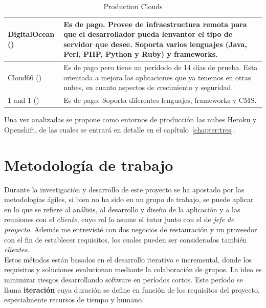 \begin{table}[H]
\begin{tabular}{p{2cm} p{8cm}}
	\hline
	DigitalOcean (\cite{URL:DigitalOcean}) & Es de pago. Provee de infraestructura remota para que el desarrollador pueda lenvantor el tipo de servidor que desee. Soporta varios lenguajes (Java, Perl, PHP, Python y Ruby) y frameworks. \\
	\hline
	Cloud66 (\cite{URL:Cloud66}) & Es de pago pero tiene un perídodo de 14 días de prueba. Esta orientada a mejora las aplicaciones que ya tenemos en otras nubes, en cuanto aspectos de crecimiento y seguridad. \\
	\hline
	1 and 1 (\cite{URL:1_and_1}) & Es de pago. Soporta diferentes lenguajes, frameworks y CMS. \\
	\hline
	\end{tabular}
	\caption{Production Clouds}
	\label{tabla:clouds}
\end{table}

Una vez analizadas se propone como entornos de producción las nubes Heroku y Openshift, de las cuales se entrará en detalle en el capítulo~\ref{chapter:tres}.


\vspace*{0.2in}
\section{Metodología de trabajo}\label{cap.1.3}

Durante la investigación y desarrollo de este proyecto se ha apostado por las metodologías ágiles, si bien no ha sido en un grupo de trabajo, se puede aplicar en lo que se refiere al análisis, al desarrollo y diseño de la aplicación y a las reuniones con el \emph{cliente}, cuyo rol lo asume el tutor junto con el de \emph{jefe de proyecto}. Además me entrevisté con dos negocios de restauración y un proveedor con el fin de establecer requisitos, los cuales pueden ser considerados también \emph{clientes}. \\

Estos métodos están basados en el desarrollo iterativo e incremental, donde los requisitos y soluciones evolucionan mediante la colaboración de grupos. La idea es minimizar riesgos desarrollando software en períodos cortos. Este período se llama \textbf{iteración} cuya duración se define en función de los requisitos del proyecto, especialmente recursos de tiempo y humano. \\


